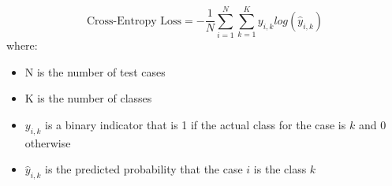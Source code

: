 \documentclass[preview]{standalone}
\begin{document}
{\large
\[
\text{Cross-Entropy Loss}=-\frac{1}{N}\sum^N_{i=1}\sum^K_{k=1}y_{i,k}log(\hat{y}_{i,k})
\]
}
where:
\begin{itemize}
	\setlength\itemsep{0.1em}
	\item N is the number of test cases
	\item K is the number of classes
	\item $y_{i,k}$ is a binary indicator that is 1 if the actual class for the case is $k$ and 0 otherwise
	\item $\hat{y}_{i,k}$ is the predicted probability that the case $i$ is the class $k$
\end{itemize}
\end{document}
